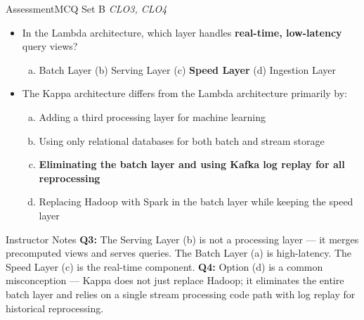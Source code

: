 \documentclass[aspectratio=169,10pt]{beamer}
\begin{document}
\begin{frame}{Assessment\textemdash MCQ Set B \hfill\small\textit{CLO3, CLO4}}
  \vspace{6pt}
  \begin{itemize}
    \item[\textbf{Q3.}] In the Lambda architecture, which layer handles \textbf{real-time, low-latency} query views?
    \begin{enumerate}[(a)]
      \item Batch Layer \quad (b) Serving Layer \quad (c) \textbf{Speed Layer} \quad (d) Ingestion Layer
    \end{enumerate}
  \end{itemize}
  \vspace{8pt}
  \begin{itemize}
    \item[\textbf{Q4.}] The Kappa architecture differs from the Lambda architecture primarily by:
    \begin{enumerate}[(a)]
      \item Adding a third processing layer for machine learning
      \item Using only relational databases for both batch and stream storage
      \item \textbf{Eliminating the batch layer and using Kafka log replay for all reprocessing}
      \item Replacing Hadoop with Spark in the batch layer while keeping the speed layer
    \end{enumerate}
  \end{itemize}
  \vspace{6pt}
  \begin{alertblock}{Instructor Notes}
    \textbf{Q3:} The Serving Layer (b) is not a processing layer --- it merges precomputed views and serves queries.  The Batch Layer (a) is high-latency.  The Speed Layer (c) is the real-time component.  \textbf{Q4:} Option (d) is a common misconception --- Kappa does not just replace Hadoop; it eliminates the entire batch layer and relies on a single stream processing code path with log replay for historical reprocessing.
  \end{alertblock}
\end{frame}
\end{document}

